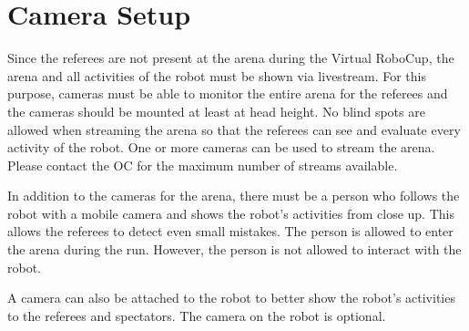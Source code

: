 \section{Camera Setup} \label{sec:CameraSetup}

Since the referees are not present at the arena during the Virtual RoboCup, the arena and all activities of the robot must be shown via livestream. For this purpose, cameras must be able to monitor the entire arena for the referees and the cameras should be mounted at least at head height. No blind spots are allowed when streaming the arena so that the referees can see and evaluate every activity of the robot. One or more cameras can be used to stream the arena. Please contact the OC for the maximum number of streams available.
\par
In addition to the cameras for the arena, there must be a person who follows the robot with a mobile camera and shows the robot's activities from close up. This allows the referees to detect even small mistakes. The person is allowed to enter the arena during the run. However, the person is not allowed to interact with the robot.
\par
A camera can also be attached to the robot to better show the robot's activities to the referees and spectators. The camera on the robot is optional.
